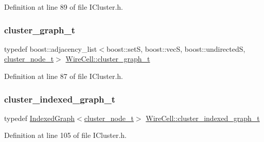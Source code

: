 Definition at line 89 of file I\+Cluster.\+h.

\mbox{\label{namespace_wire_cell_a6a9ecba14dfba50cdb081820a8bcacbe}} 
\subsubsection{\texorpdfstring{cluster\+\_\+graph\+\_\+t}{cluster\_graph\_t}}
{\footnotesize\ttfamily typedef boost\+::adjacency\+\_\+list$<$boost\+::setS, boost\+::vecS, boost\+::undirectedS, \hyperlink{struct_wire_cell_1_1cluster__node__t}{cluster\+\_\+node\+\_\+t}$>$ \hyperlink{namespace_wire_cell_a6a9ecba14dfba50cdb081820a8bcacbe}{Wire\+Cell\+::cluster\+\_\+graph\+\_\+t}}



Definition at line 87 of file I\+Cluster.\+h.

\mbox{\label{namespace_wire_cell_a81d03e7272d04b607afc90bd3f7a9499}} 
\subsubsection{\texorpdfstring{cluster\+\_\+indexed\+\_\+graph\+\_\+t}{cluster\_indexed\_graph\_t}}
{\footnotesize\ttfamily typedef \hyperlink{class_wire_cell_1_1_indexed_graph}{Indexed\+Graph}$<$\hyperlink{struct_wire_cell_1_1cluster__node__t}{cluster\+\_\+node\+\_\+t}$>$ \hyperlink{namespace_wire_cell_a81d03e7272d04b607afc90bd3f7a9499}{Wire\+Cell\+::cluster\+\_\+indexed\+\_\+graph\+\_\+t}}



Definition at line 105 of file I\+Cluster.\+h.

\mbox{\label{namespace_wire_cell_a0dd058393dc7c7e35d888c206b9d479d}} 
